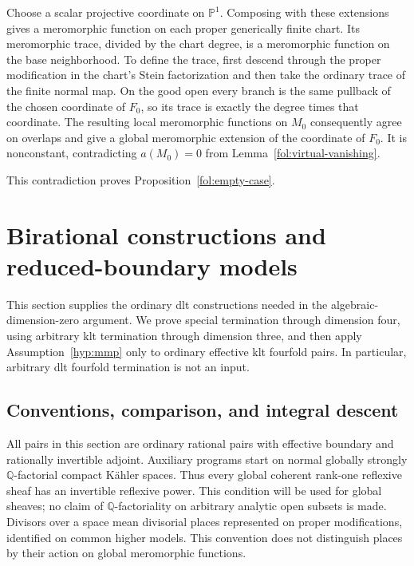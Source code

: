 \documentclass[11pt,letterpaper]{article}
\theoremstyle{definition}
\theoremstyle{remark}
\begin{document}
Choose a scalar projective coordinate on $\mathbb{P}^1$.  Composing with
these extensions gives a meromorphic function on each proper
generically finite chart.  Its meromorphic trace, divided by the
chart degree, is a meromorphic function on the base neighborhood.
To define the trace, first descend through the proper modification
in the chart's Stein factorization and then take the ordinary trace
of the finite normal map.  On the good open every branch is the
same pullback of the chosen coordinate of $F_0$, so its trace is
exactly the degree times that coordinate.  The resulting local
meromorphic functions on $M_0$ consequently agree on overlaps and
give a global meromorphic extension of the coordinate of $F_0$.
It is nonconstant, contradicting $a(M_0)=0$ from
Lemma~\ref{fol:virtual-vanishing}.

This contradiction proves Proposition~\ref{fol:empty-case}.

\section{Birational constructions and reduced-boundary models}
\label{bir:section}

This section supplies the ordinary dlt constructions needed in the
algebraic-dimension-zero argument.  We prove special termination through
dimension four, using arbitrary klt termination through dimension three,
and then apply Assumption~\ref{hyp:mmp} only to ordinary effective klt
fourfold pairs.  In particular, arbitrary dlt fourfold termination is not
an input.

\subsection{Conventions, comparison, and integral descent}
\label{bir:conventions}

All pairs in this section are ordinary rational pairs with effective
boundary and rationally invertible adjoint.  Auxiliary programs start
on normal globally strongly $\mathbb{Q}$-factorial compact K\"ahler spaces.
Thus every global coherent rank-one reflexive sheaf has an invertible
reflexive power.  This condition will be used for global sheaves; no
claim of $\mathbb{Q}$-factoriality on arbitrary analytic open subsets is made.
Divisors over a space mean divisorial places represented on proper
modifications, identified on common higher models.  This convention
does not distinguish places by their action on global meromorphic
functions.
\end{document}
